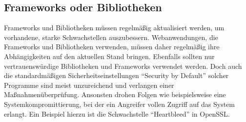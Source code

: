 \subsection{Frameworks oder Bibliotheken}
Frameworks und Bibliotheken müssen regelmäßig aktualisiert werden, um vorhandene, starke Schwachstellen auszubessern.
Webanwendungen, die Frameworks und Bibliotheken verwenden, müssen daher regelmäßig ihre Abhängigkeiten auf den aktuellen Stand bringen. Ebenfalls sollten nur vertrauenswürdige Bibliotheken und Frameworks verwendet werden. Doch auch die standardmäßigen Sicherheitseinstellungen \enquote{Security by Default} solcher Programme sind meist unzureichend und verlangen einer Maßnahmenüberprüfung.
Ansonsten drohen Folgen wie beispielsweise eine Systemkompromittierung, bei der ein Angreifer vollen Zugriff auf das System erlangt.
Ein Beispiel hierzu ist die Schwachstelle \enquote{Heartbleed} in OpenSSL.
